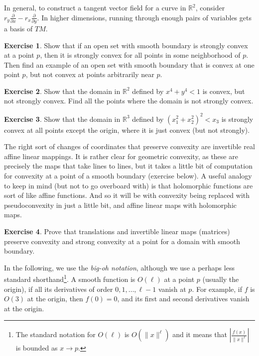 \documentclass[12pt,openany]{book}
\newcommand{\snorm}[1]{\lVert {#1} \rVert}
\newcommand{\abs}[1]{\left\lvert {#1} \right\rvert}
\newcommand{\R}{{\mathbb{R}}}
\newcommand{\myindex}[1]{#1\index{#1}}
\theoremstyle{plain}
\theoremstyle{remark}
\theoremstyle{definition}
\newenvironment{exbox}{%
    \def\FrameCommand{\vrule width 1pt \relax\hspace{10pt}}%
    \MakeFramed{\advance\hsize-\width\FrameRestore}%
}{%
    \endMakeFramed
}
\theoremstyle{exercise}
\newtheorem{exercise}{Exercise}[section]
\theoremstyle{example}
\begin{document}
In general, to construct a tangent vector field for
a curve in $\R^2$,
consider
$r_y \frac{\partial}{\partial x} - r_x \frac{\partial}{\partial y}$.  In
higher dimensions, running through enough pairs of variables gets
a basis of $TM$.

\begin{exbox}
\begin{exercise}
Show that if an open set with smooth boundary is strongly convex at a point $p$,
then it is strongly convex for all points in some neighborhood of $p$.
Then find an example of
an open set with smooth boundary that is convex at one point $p$,
but not convex at points arbitrarily near $p$.
\end{exercise}

\begin{exercise}
Show that the domain in $\R^2$ defined by $x^4+y^4 < 1$ is convex, but not strongly convex.
Find all the points where the domain is not strongly convex.
\end{exercise}

\begin{exercise}
Show that the domain in $\R^3$ defined by ${(x_1^2+x_2^2)}^2 < x_3$ is
strongly convex at all points except the origin, where it is just convex
(but not strongly).
\end{exercise}
\end{exbox}

The right sort of changes of coordinates that preserve convexity are
invertible real affine linear mappings.
It is rather clear for geometric convexity, as these are precisely the maps
that take lines to lines,
but it takes a little bit of computation for convexity at a point of
a smooth boundary (exercise below).
A useful analogy to keep in mind (but not to go overboard with) is that 
holomorphic functions are sort of like affine functions.  And so it will be
with convexity being replaced with pseudoconvexity in just a little bit, and
affine linear maps with holomorphic maps.

\begin{exbox}
\begin{exercise}
Prove that translations and invertible linear maps (matrices) preserve
convexity and strong convexity at a point for a domain with smooth boundary.
\end{exercise}
\end{exbox}

In the following, %
we use the \emph{\myindex{big-oh notation}},
although we use a perhaps less standard shorthand\footnote{%
The standard notation for $O(\ell)$ is $O(\snorm{x}^{\ell})$ and
it means that
$\abs{\frac{f(x)}{\snorm{x}^\ell}}$ is bounded as $x \to p$.}.
A smooth function is $O(\ell)$ at a point $p$ (usually the origin),
if all its derivatives of order $0, 1, \ldots,  \ell-1$ vanish at $p$.
For example, if $f$ is $O(3)$ at the origin,
then $f(0)=0$, and its first and second derivatives vanish at the origin.
\end{document}
